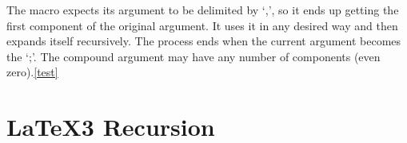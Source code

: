 
The macro \cmd{\pickup} expects its argument to be delimited by `,’, so it ends up
getting the first component of the original argument. It uses it in any desired way and
then expands itself recursively. The process ends when the current argument becomes the `;’. The compound argument may have any number of components (even zero).\ref{test}

\section{LaTeX3 Recursion}












